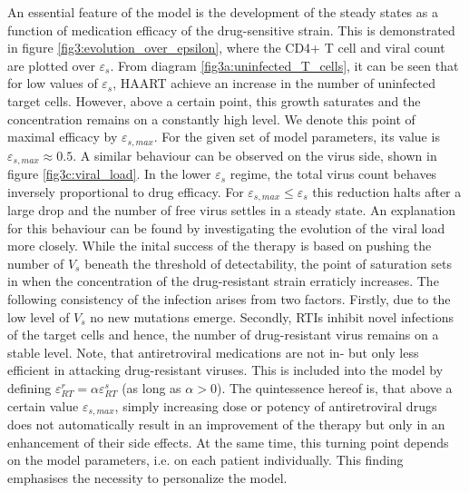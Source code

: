 An essential feature of the model is the development of the steady states as a function of medication efficacy of the drug-sensitive strain.
This is demonstrated in figure \ref{fig3:evolution_over_epsilon}, where the CD4+ T cell and viral count are plotted over $\varepsilon_s$.
From diagram \ref{fig3a:uninfected_T_cells}, it can be seen that for low values of $\varepsilon_s$, HAART achieve an increase in the 
number of uninfected target cells.
However, above a certain point, this growth saturates and the concentration remains on a constantly high level.
We denote this point of maximal efficacy by $\varepsilon_{s,max}$. 
For the given set of model parameters, its value is $\varepsilon_{s,max} \approx 0.5$.
A similar behaviour can be observed on the virus side, shown in figure \ref{fig3c:viral_load}.
In the lower $\varepsilon_s$ regime, the total virus count behaves inversely proportional to drug efficacy.
For $\varepsilon_{s,max} \leq \varepsilon_{s}$ this reduction halts after a large drop and the number of free virus settles in a steady state.\newline
An explanation for this behaviour can be found by investigating the evolution of the viral load more closely.
While the inital success of the therapy is based on pushing the number of $V_s$ beneath the threshold of detectability, 
the point of saturation sets in when the concentration of the drug-resistant strain erraticly increases.
The following consistency of the infection arises from two factors.
Firstly, due to the low level of $V_s$ no new mutations emerge.
Secondly, RTIs inhibit novel infections of the target cells and hence, the number of drug-resistant virus remains on a stable level.
Note, that antiretroviral medications are not in- but only less efficient in attacking drug-resistant viruses.
This is included into the model by defining $\varepsilon_{RT}^r = \alpha \varepsilon_{RT}^s$ (as long as $\alpha > 0$).\newline
The quintessence hereof is, that above a certain value $\varepsilon_{s,max}$, simply increasing dose or potency of antiretroviral drugs does not automatically 
result in an improvement of the therapy but only in an enhancement of their side effects.
At the same time, this turning point depends on the model parameters, i.e. on each patient individually.
This finding emphasises the necessity to personalize the model.

